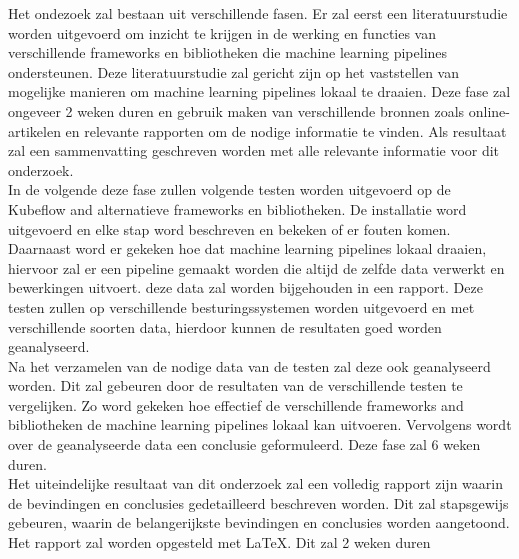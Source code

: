 Het ondezoek zal bestaan uit verschillende fasen. Er zal eerst een literatuurstudie worden uitgevoerd om inzicht te krijgen in de werking en
functies van verschillende frameworks en bibliotheken die machine learning pipelines ondersteunen.
Deze literatuurstudie zal gericht zijn op het vaststellen van mogelijke manieren om machine learning pipelines lokaal te draaien. Deze fase zal ongeveer 2 weken duren en gebruik maken van verschillende bronnen zoals online-artikelen en relevante rapporten om de nodige informatie te vinden. Als resultaat zal een sammenvatting geschreven worden met alle relevante informatie voor dit onderzoek.\\

In de volgende deze fase zullen volgende testen worden uitgevoerd op de Kubeflow and alternatieve frameworks en bibliotheken. De installatie word uitgevoerd en elke stap word beschreven en bekeken of er fouten komen. Daarnaast word er gekeken hoe dat machine learning pipelines lokaal draaien, hiervoor zal er een pipeline gemaakt worden die altijd de zelfde data verwerkt en bewerkingen uitvoert. deze data zal worden bijgehouden in een rapport.
Deze testen zullen op verschillende besturingssystemen worden uitgevoerd en met verschillende soorten data, hierdoor kunnen de resultaten goed worden geanalyseerd.\\

Na het verzamelen van de nodige data van de testen zal deze ook geanalyseerd worden. Dit zal gebeuren door de resultaten van de verschillende testen te vergelijken. Zo word gekeken hoe effectief de verschillende frameworks and bibliotheken de machine learning pipelines lokaal kan uitvoeren. Vervolgens wordt over de geanalyseerde data een conclusie geformuleerd.
Deze fase zal 6 weken duren.\\

Het uiteindelijke resultaat van dit onderzoek zal een volledig rapport zijn waarin de bevindingen en conclusies  gedetailleerd beschreven worden. Dit zal stapsgewijs gebeuren, waarin de belangerijkste bevindingen en conclusies worden aangetoond. Het rapport zal worden opgesteld met LaTeX. Dit zal 2 weken duren\\



